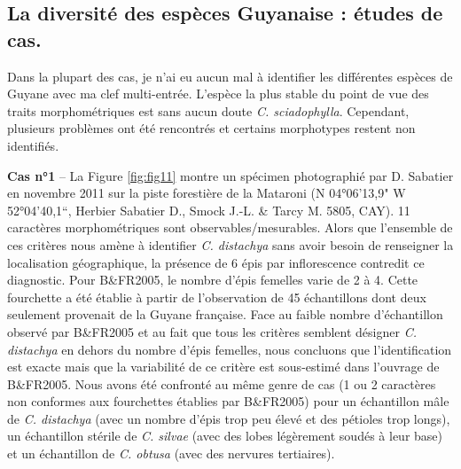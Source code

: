\documentclass[a4paper]{article}
\theoremstyle{definition}
\theoremstyle{definition}
\theoremstyle{definition}
\theoremstyle{remark}
\begin{document}
\subsection{La diversité des espèces Guyanaise : études de
cas.}\label{la-diversite-des-especes-guyanaise-etudes-de-cas.}

Dans la plupart des cas, je n'ai eu aucun mal à identifier les
différentes espèces de Guyane avec ma clef multi-entrée. L'espèce la
plus stable du point de vue des traits morphométriques est sans aucun
doute \emph{C. sciadophylla}. Cependant, plusieurs problèmes ont été
rencontrés et certains morphotypes restent non identifiés.

\textbf{Cas n°1} -- La Figure \ref{fig:fig11} montre un spécimen
photographié par D. Sabatier en novembre 2011 sur la piste forestière de
la Mataroni (N 04°06'13,9" W 52°04'40,1``, Herbier Sabatier D., Smock
J.-L. \& Tarcy M. 5805, CAY). 11 caractères morphométriques sont
observables/mesurables. Alors que l'ensemble de ces critères nous amène
à identifier \emph{C. distachya} sans avoir besoin de renseigner la
localisation géographique, la présence de 6 épis par inflorescence
contredit ce diagnostic. Pour B\&FR2005, le nombre d'épis femelles varie
de 2 à 4. Cette fourchette a été établie à partir de l'observation de 45
échantillons dont deux seulement provenait de la Guyane française. Face
au faible nombre d'échantillon observé par B\&FR2005 et au fait que tous
les critères semblent désigner \emph{C. distachya} en dehors du nombre
d'épis femelles, nous concluons que l'identification est exacte mais que
la variabilité de ce critère est sous-estimé dans l'ouvrage de
B\&FR2005. Nous avons été confronté au même genre de cas (1 ou 2
caractères non conformes aux fourchettes établies par B\&FR2005) pour un
échantillon mâle de \emph{C. distachya} (avec un nombre d'épis trop peu
élevé et des pétioles trop longs), un échantillon stérile de \emph{C.
silvae} (avec des lobes légèrement soudés à leur base) et un échantillon
de \emph{C. obtusa} (avec des nervures tertiaires).
\end{document}
